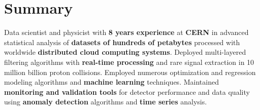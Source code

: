 \documentclass{myfancycv}
\begin{document}
\makeheader
\vspace*{-.35em}

  \vspace*{-0.5em}
\section{Summary}

Data scientist and physicist with {\bf 8 years experience} at {\bf CERN} in advanced statistical analysis of {\bf datasets of hundreds of petabytes} processed with worldwide {\bf distributed cloud computing systems}. Deployed multi-layered filtering algorithms with
{\bf real-time processing} and rare signal extraction in 10 million billion proton collisions.
Employed numerous optimization and regression modeling algorithms and {\bf machine learning} techniques.
Maintained {\bf monitoring and validation tools} for detector performance and data quality using {\bf anomaly detection} algorithms and {\bf time series} analysis.



\end{document}
